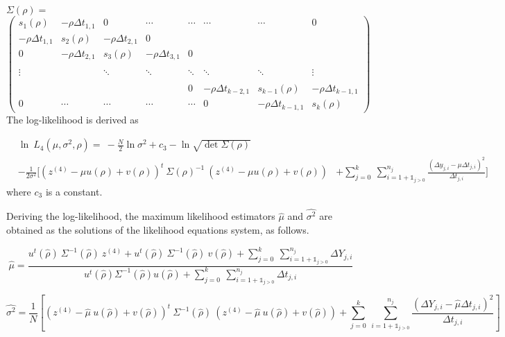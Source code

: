 $ \Sigma(\rho)=$
$\begin{pmatrix} 
s_1(\rho) & -\rho \Delta t_{1,1} & 0 & \cdots&\cdots &  \cdots &\cdots & 0\\ 
-\rho \Delta t_{1,1} & s_2(\rho) & -\rho \Delta t_{2,1}  &0&& & & \\
0&-\rho \Delta t_{2,1} & s_3(\rho) & -\rho \Delta t_{3,1}  &0& & & \\
&&&&&&\\
\vdots&&\ddots&\ddots & \ddots & \ddots  &\ddots & \vdots\\
&&&&&&\\
&&&&0&-\rho \Delta t_{k-2,1} & s_{k-1}(\rho) & -\rho \Delta t_{k-1,1}  \\

0&\cdots& \cdots& \cdots& \cdots&0& -\rho \Delta t_{k-1,1} &s_{k}(\rho)

\end{pmatrix}$\\[1.3 cm]


\noindent The log-likelihood is derived as

\begin{align}
&\ln\ L_4\left(\mu,\sigma^2,\rho \right)=\ -\frac{N}{2} \ln \sigma^2 + c_3 - \ln \sqrt{\det \Sigma(\rho)} \nonumber\\
&-\frac{1}{2\sigma^2}\Bigg[(z^{(4)}-\mu u (\rho)+ v(\rho))^t \ \Sigma(\rho)^{-1} \ (z^{(4)}-\mu u(\rho) + v(\rho))
&+\sum\limits_{j=0}^{k}\ \sum\limits_{i=1+\mathds{1}_{j>0}}^{n_j} \frac{(\Delta y_{j,i}-\mu \Delta t_{j,i})^2}{\Delta t_{j,i}} \Bigg]
\label{eq:like_scheme4}
\end{align}
\noindent where $c_3$ is a constant.

\vspace{3mm}



\noindent Deriving the log-likelihood, the maximum likelihood estimators $\hat{\mu}$ and $\hat{\sigma^2}$ are obtained as the solutions of the likelihood equations system, as follows.


\begin{equation}
\hat{\mu}=\frac{u^t(\hat{\rho}) \ \Sigma^{-1}(\hat{\rho}) \ z^{(4)} + u^t(\hat{\rho}) \ \Sigma^{-1}(\hat{\rho}) \ v(\hat{\rho}) + \sum\limits_{j=0}^{k}\ \sum\limits _{i=1+\mathds{1}_{j>0}}^{n_j} \Delta Y_{j,i}}{u^t(\hat{\rho}) \Sigma^{-1}(\hat{\rho}) u(\hat{\rho})+ \sum\limits_{j=0}^{k}\ \sum\limits _{i=1+\mathds{1}_{j>0}}^{n_j}\Delta t_{j,i}}
\end{equation}


\begin{equation}
\hat{\sigma^2}=\frac{1}{N} \left[(z^{(4)}-\hat{\mu}\ u(\hat{\rho}) + v(\hat{\rho}))^t \ \Sigma^{-1}(\hat{\rho}) \ (z^{(4)}-\hat{\mu}\ u(\hat{\rho})+ v(\hat{\rho}))+ \sum\limits_{j=0}^{k}\ \sum\limits _{i=1+\mathds{1}_{j>0}}^{n_j}\frac{(\Delta Y_{j,i}-\hat{\mu}  \Delta t_{j,i})^2}{\Delta t_{j,i}} \right]
\end{equation}

